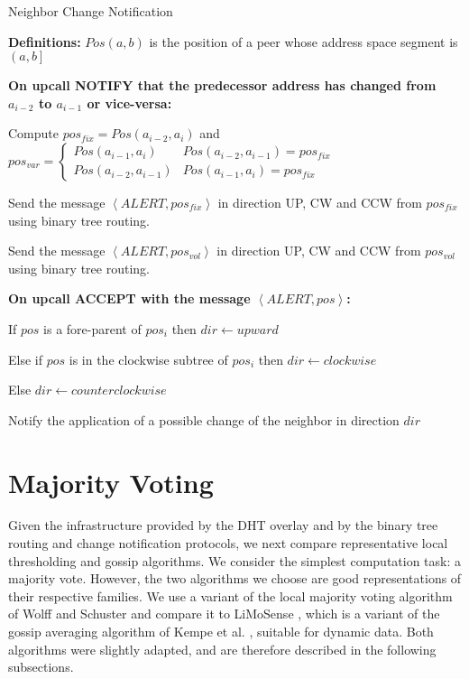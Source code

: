 \documentclass[12pt,english,journal]{elsarticle}
\numberwithin{equation}{section}
\numberwithin{figure}{section}
\theoremstyle{plain}
\theoremstyle{plain}
\begin{document}
\begin{algorithm*}
\caption{\label{alg:Change-Notification}Neighbor Change Notification}


\textbf{Definitions:} $Pos\left(a,b\right)$ is the position of a
peer whose address space segment is $\left(a,b\right]$

\textbf{On upcall NOTIFY that the predecessor address has changed
from $a_{i-2}$ to $a_{i-1}$ or vice-versa:}

Compute $pos_{fix}=Pos\left(a_{i-2},a_{i}\right)$ and $pos_{var}=\begin{cases}
Pos\left(a_{i-1},a_{i}\right) & Pos\left(a_{i-2},a_{i-1}\right)=pos_{fix}\\
Pos\left(a_{i-2},a_{i-1}\right) & Pos\left(a_{i-1},a_{i}\right)=pos_{fix}
\end{cases}$

Send the message $\left\langle ALERT,pos_{fix}\right\rangle $ in
direction UP, CW and CCW from $pos_{fix}$ using binary tree routing.

Send the message $\left\langle ALERT,pos_{vol}\right\rangle $ in
direction UP, CW and CCW from $pos_{vol}$ using binary tree routing.

\noindent \begin{raggedright}
\textbf{On upcall ACCEPT with the message $\left\langle ALERT,pos\right\rangle $:}
\par\end{raggedright}

If $pos$ is a fore-parent of $pos_{i}$ then $dir\leftarrow upward$

Else if $pos$ is in the clockwise subtree of $pos_{i}$ then $dir\leftarrow clockwise$

Else $dir\leftarrow counterclockwise$

Notify the application of a possible change of the neighbor in direction
$dir$
\end{algorithm*}



\section{\label{sec:Majority-voting}Majority Voting }

Given the infrastructure provided by the DHT overlay and by the binary
tree routing and change notification protocols, we next compare representative
local thresholding and gossip algorithms. We consider the simplest
computation task: a majority vote. However, the two algorithms we
choose are good representations of their respective families. We use
a variant of the local majority voting algorithm of Wolff and Schuster
\citep{MajorityRulej} and compare it to LiMoSense \citep{dynamicGossip},
which is a variant of the gossip averaging algorithm of Kempe et al.
\citep{KempeGossip}, suitable for dynamic data. Both algorithms were
slightly adapted, and are therefore described in the following subsections. 
\end{document}
